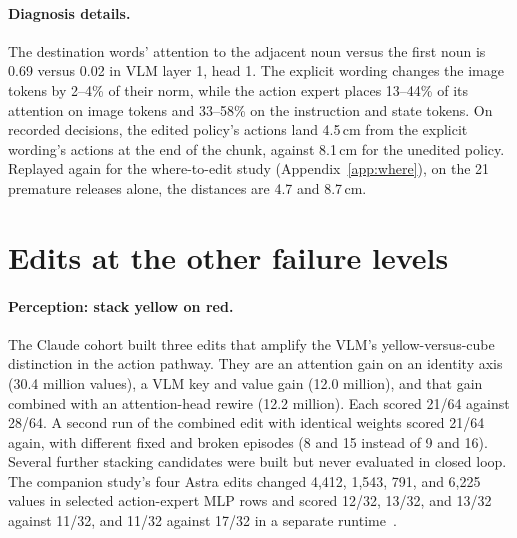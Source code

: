 \documentclass{article}
\begin{document}
\paragraph{Diagnosis details.} The destination words' attention to the adjacent noun versus the first noun is 0.69 versus 0.02 in VLM layer 1, head 1. The explicit wording changes the image tokens by 2--4\% of their norm, while the action expert places 13--44\% of its attention on image tokens and 33--58\% on the instruction and state tokens. On recorded decisions, the edited policy's actions land 4.5\,cm from the explicit wording's actions at the end of the chunk, against 8.1\,cm for the unedited policy. Replayed again for the where-to-edit study (Appendix~\ref{app:where}), on the 21 premature releases alone, the distances are 4.7 and 8.7\,cm.

\FloatBarrier
\section{Edits at the other failure levels}
\label{app:other}
\paragraph{Perception: stack yellow on red.} The Claude cohort built three edits that amplify the VLM's yellow-versus-cube distinction in the action pathway. They are an attention gain on an identity axis (30.4 million values), a VLM key and value gain (12.0 million), and that gain combined with an attention-head rewire (12.2 million). Each scored 21/64 against 28/64. A second run of the combined edit with identical weights scored 21/64 again, with different fixed and broken episodes (8 and 15 instead of 9 and 16). Several further stacking candidates were built but never evaluated in closed loop. The companion study's four Astra edits changed 4,412, 1,543, 791, and 6,225 values in selected action-expert MLP rows and scored 12/32, 13/32, and 13/32 against 11/32, and 11/32 against 17/32 in a separate runtime~\citep{abbas2026wspstudy}.
\end{document}
